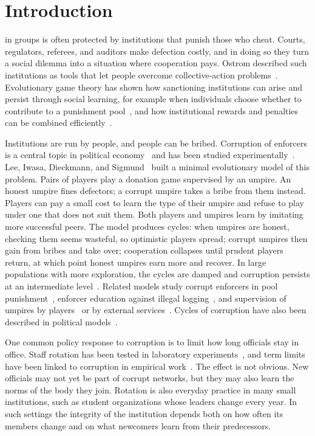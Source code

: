\documentclass[journal]{IEEEtran}
\begin{document}
\section{Introduction}

 in groups is often protected by institutions that punish those who
cheat. Courts, regulators, referees, and auditors make defection costly, and in doing so they
turn a social dilemma into a situation where cooperation pays. Ostrom described such
institutions as tools that let people overcome collective-action problems~\cite{ostrom1990commons}.
Evolutionary game theory has shown how sanctioning institutions can arise and persist through
social learning, for example when individuals choose whether to contribute to a punishment
pool~\cite{sigmund2010social}, and how institutional rewards and penalties can be combined
efficiently~\cite{sasaki2014optional,chen2015carrot}.

Institutions are run by people, and people can be bribed. Corruption of enforcers is a central
topic in political economy~\cite{roseackerman2016corruption} and has been studied
experimentally~\cite{muthukrishna2017corrupting}. Lee, Iwasa, Dieckmann, and
Sigmund~\cite{lee2019social} built a minimal evolutionary model of this problem. Pairs of players
play a donation game supervised by an umpire. An honest umpire fines defectors; a corrupt umpire
takes a bribe from them instead. Players can pay a small cost to learn the type of their umpire
and refuse to play under one that does not suit them. Both players and umpires learn by imitating
more successful peers. The model produces cycles: when umpires are honest, checking them seems
wasteful, so optimistic players spread; corrupt umpires then gain from bribes and take over;
cooperation collapses until prudent players return, at which point honest umpires earn more and
recover. In large populations with more exploration, the cycles are damped and corruption
persists at an intermediate level~\cite{lee2019social}. Related models study corrupt enforcers in
pool punishment~\cite{liu2019corrupt}, enforcer education against illegal
logging~\cite{lee2015logging}, and supervision of umpires by players~\cite{shi2023bidirectional}
or by external services~\cite{zhou2023supervision}. Cycles of corruption have also been described
in political models~\cite{bicchieri1997cycles}.

One common policy response to corruption is to limit how long officials stay in office. Staff
rotation has been tested in laboratory experiments~\cite{abbink2004rotation,buhren2020rotation},
and term limits have been linked to corruption in empirical
work~\cite{ferraz2011electoral,laurent2021horizon}. The effect is not obvious. New officials may
not yet be part of corrupt networks, but they may also learn the norms of the body they join.
Rotation is also everyday practice in many small institutions, such as student organizations
whose leaders change every year. In such settings the integrity of the institution depends both
on how often its members change and on what newcomers learn from their predecessors.
\end{document}
